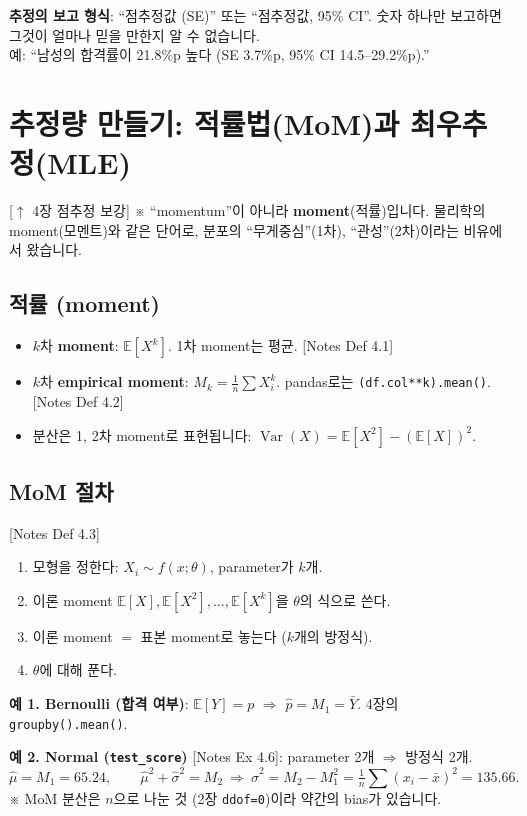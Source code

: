 \documentclass[11pt,a4paper]{article}
\newcommand{\E}{\mathbb{E}}
\newcommand{\Var}{\operatorname{Var}}
\newcommand{\term}[1]{\textbf{#1}}
\newcommand{\code}[1]{\texttt{#1}}
\newcommand{\nref}[1]{{\footnotesize\textsf{\color{blue!55!black}[Notes #1]}}}
\newcommand{\aside}[1]{{\footnotesize\color{black!65}#1}}
\newcommand{\linkup}[1]{{\footnotesize\textsf{\color{green!40!black}[$\uparrow$ #1 보강]}}}
\begin{document}
\begin{hypbox}
\textbf{추정의 보고 형식}: ``점추정값 (SE)'' 또는 ``점추정값, 95\% CI''. 숫자 하나만 보고하면 그것이 얼마나 믿을 만한지 알 수 없습니다.\\
예: ``남성의 합격률이 21.8\%p 높다 (SE 3.7\%p, 95\% CI 14.5–29.2\%p).''
\end{hypbox}

\section{추정량 만들기: 적률법(MoM)과 최우추정(MLE)}
\linkup{4장 점추정}
\aside{※ ``momentum''이 아니라 \term{moment}(적률)입니다. 물리학의 moment(모멘트)와 같은 단어로, 분포의 ``무게중심''(1차), ``관성''(2차)이라는 비유에서 왔습니다.}

\subsection{적률 (moment)}
\begin{itemize}
\item $k$차 \term{moment}: $\E[X^k]$. 1차 moment는 평균. \nref{Def 4.1}
\item $k$차 \term{empirical moment}: $M_k=\frac1n\sum X_i^k$. pandas로는 \code{(df.col**k).mean()}. \nref{Def 4.2}
\item 분산은 1, 2차 moment로 표현됩니다: $\Var(X)=\E[X^2]-(\E[X])^2$.
\end{itemize}

\subsection{MoM 절차} \nref{Def 4.3}
\begin{enumerate}
\item 모형을 정한다: $X_i\sim f(x;\theta)$, parameter가 $k$개.
\item 이론 moment $\E[X],\E[X^2],\dots,\E[X^k]$을 $\theta$의 식으로 쓴다.
\item 이론 moment $=$ 표본 moment로 놓는다 ($k$개의 방정식).
\item $\theta$에 대해 푼다.
\end{enumerate}

\textbf{예 1. Bernoulli (합격 여부)}: $\E[Y]=p$ $\Rightarrow$ $\hat p=M_1=\bar Y$. 4장의 \code{groupby().mean()}.

\textbf{예 2. Normal (\code{test\_score})} \nref{Ex 4.6}: parameter 2개 $\Rightarrow$ 방정식 2개.
\[
\hat\mu=M_1=65.24,\qquad \hat\mu^2+\hat\sigma^2=M_2\ \Rightarrow\ \hat\sigma^2=M_2-M_1^2=\tfrac1n\textstyle\sum(x_i-\bar x)^2=135.66.
\]
\aside{※ MoM 분산은 $n$으로 나눈 것 (2장 \code{ddof=0})이라 약간의 bias가 있습니다.}
\end{document}
